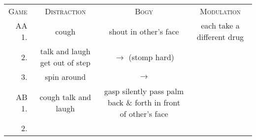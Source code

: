 \begin{tabular}{ r c c c }
	\textsc{Game} & \textsc{Distraction} & \textsc{Bogy} & \textsc{Modulation} \\
	AA 1. & cough & shout in other's face & each take a different drug \\
	2. & talk and laugh \linebreak get out of step & $\rightarrow$ \linebreak (stomp hard) & \\
	3. & spin around & $\rightarrow$ & \\
	AB 1. & cough \linebreak talk and laugh & gasp \linebreak silently pass palm back \& forth in front of other's face & \\
	2. & & & \\
\end{tabular}


